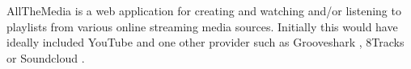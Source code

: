 AllTheMedia is a web application for creating and watching and/or
listening to playlists from various online streaming media sources.
Initially this would have ideally included YouTube \cite{YouTube} and
one other provider such as Grooveshark \cite{Grooveshark}, 8Tracks
\cite{8tracks} or Soundcloud \cite{SoundCloud}.